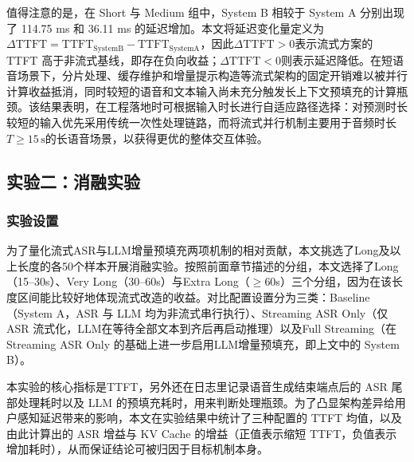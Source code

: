 \documentclass[UTF8,a4paper,zihao=5]{ctexart}
\begin{document}
值得注意的是，在 Short 与 Medium 组中，System B 相较于 System A 分别出现了 114.75 ms 和 36.11 ms 的延迟增加。本文将延迟变化量定义为$\Delta \mathrm{TTFT}=\mathrm{TTFT}_{\mathrm{SystemB}}-\mathrm{TTFT}_{\mathrm{SystemA}}$，因此$\Delta \mathrm{TTFT}>0$表示流式方案的 TTFT 高于非流式基线，即存在负向收益；$\Delta \mathrm{TTFT}<0$则表示延迟降低。在短语音场景下，分片处理、缓存维护和增量提示构造等流式架构的固定开销难以被并行计算收益抵消，同时较短的语音和文本输入尚未充分触发长上下文预填充的计算瓶颈。该结果表明，在工程落地时可根据输入时长进行自适应路径选择：对预测时长较短的输入优先采用传统一次性处理链路，而将流式并行机制主要用于音频时长$T\geq 15\,\mathrm{s}$的长语音场景，以获得更优的整体交互体验。

\subsection{实验二：消融实验}

\subsubsection{实验设置}

为了量化流式ASR与LLM增量预填充两项机制的相对贡献，本文挑选了Long及以上长度的各50个样本开展消融实验。按照前面章节描述的分组，本文选择了Long（15--30s）、Very Long（30--60s）与Extra Long（$\geq$60s）三个分组，因为在该长度区间能比较好地体现流式改造的收益。对比配置设置分为三类：Baseline（System A，ASR 与 LLM 均为非流式串行执行）、Streaming ASR Only（仅 ASR 流式化，LLM在等待全部文本到齐后再启动推理）以及Full Streaming（在 Streaming ASR Only 的基础上进一步启用LLM增量预填充，即上文中的 System B）。

本实验的核心指标是TTFT，另外还在日志里记录语音生成结束端点后的 ASR 尾部处理耗时以及 LLM 的预填充耗时，用来判断处理瓶颈。为了凸显架构差异给用户感知延迟带来的影响，本文在实验结果中统计了三种配置的 TTFT 均值，以及由此计算出的 ASR 增益与 KV Cache 的增益（正值表示缩短 TTFT，负值表示增加耗时），从而保证结论可被归因于目标机制本身。
\end{document}
